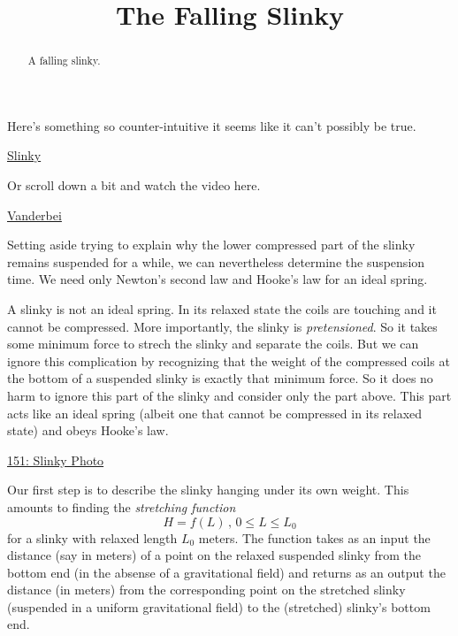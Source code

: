 \documentclass{ximera}
\title{The Falling Slinky}
\begin{document}
\begin{abstract}
A falling slinky.
\end{abstract}
\maketitle

Here's something so counter-intuitive it seems like it can't possibly be true.

\begin{center}  
\end{center}


\href{https://www.youtube.com/watch?v=k5s1cMNTmGs}{Slinky}



Or scroll down a bit and watch the video here.

\href{dsffdhttps://vanderbei.princeton.edu/WebGL/Slinky.html}{Vanderbei}

Setting aside trying to explain why the lower compressed part of the slinky remains suspended for a while, we can nevertheless determine the suspension time. We need only Newton's second law and Hooke's law for an ideal spring.

A slinky is not an ideal spring. In its relaxed state the coils are touching and it cannot be compressed. More importantly, the slinky is \emph{pretensioned}. So it takes some minimum force to strech the slinky and separate the coils. But we can ignore this complication by recognizing that the weight of the compressed coils at the bottom of a suspended slinky is exactly that minimum force. So it does no harm to ignore this part of the slinky and consider only the part above. This part acts like an ideal spring (albeit one that cannot be compressed in its relaxed state) and obeys Hooke's law.

\begin{onlineOnly}
    \begin{center}
\end{center}
\end{onlineOnly}

\href{https://www.desmos.com/calculator/zqjjgael5j}{151: Slinky Photo}



Our first step is to describe the slinky hanging under its own weight. This amounts to finding the \emph{stretching function}
\[
   H = f(L) \, , \, 0\leq L \leq L_0 
\]
for a slinky with relaxed length $L_0$ meters. The function takes as an input the distance (say in meters) of a point on the relaxed suspended slinky from the bottom end (in the absense of a gravitational field) and returns as an output the distance (in meters) from the corresponding point on the stretched slinky (suspended in a uniform gravitational field) to the (stretched) slinky's bottom end. 
\end{document}
